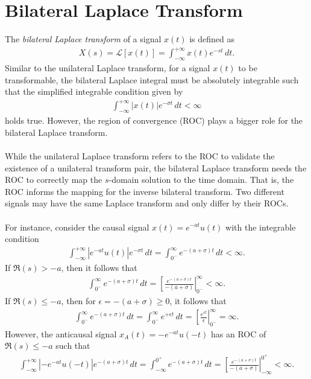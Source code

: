 \documentclass{report}
\begin{document}
\section{Bilateral Laplace Transform}
The \emph{bilateral Laplace transform} of a signal $x(t)$ is defined as  
\begin{align}
    X(s) = \mathcal{L}[x(t)] = \int_{-\infty}^{+\infty} x(t) e^{-st} \,dt.
\end{align}
Similar to the unilateral Laplace transform, for a signal $x(t)$ to be transformable, the bilateral Laplace integral must be absolutely integrable such that 
the simplified integrable condition given by 
\begin{align}
    \int_{-\infty}^{+\infty} |x(t)| e^{-\sigma t} \,dt < \infty
\end{align}
holds true. However, the region of convergence (ROC) plays a bigger role for the bilateral Laplace transform. 
\\ \\ 
While the unilateral Laplace transform refers to the ROC 
to validate the existence of a unilateral transform pair, the bilateral Laplace transform needs the ROC to correctly map the $s$-domain solution to the time domain. 
That is, the ROC informs the mapping for the inverse bilateral transform. Two different signals may have the same Laplace transform and only differ by their ROCs. 
\\ \\
For instance, consider the causal signal $x(t)=e^{-at}u(t)$ with the integrable condition
\begin{align*}
    \int_{-\infty}^{+\infty} |e^{-at}u(t)| e^{-\sigma t} \,dt = \int_{0^-}^{\infty} e^{-(a+\sigma) t} \,dt < \infty.
\end{align*}
If $\Re(s) > -a$, then it follows that 
\begin{align*}
    \int_{0^-}^{\infty} e^{-(a+\sigma) t} \,dt = \left[\frac{e^{-(a+\sigma) t}}{-(a+\sigma)}\right|_{0^-}^{\infty} < \infty.
\end{align*}
If $\Re(s) \leq -a$, then for $\epsilon=-(a+\sigma)\geq 0$, it follows that
\begin{align*}
    \int_{0^-}^{\infty} e^{-(a+\sigma) t} \,dt = \int_{0^-}^{\infty} e^{+\epsilon t} \,dt = \left[\frac{e^{\epsilon t}}{\epsilon}\right|_{0^-}^{\infty} = \infty.
\end{align*}
However, the anticausal signal $x_{A}(t)= -e^{-at}u(-t)$ has an ROC of $\Re(s)\leq -a$ such that 
\begin{align*}
    \int_{-\infty}^{+\infty} |-e^{-at}u(-t)|e^{-(a+\sigma) t} \,dt = \int_{-\infty}^{0^+} e^{-(a+\sigma)t} \,dt = \left[\frac{e^{-(a+\sigma) t}}{-(a+\sigma)}\right|_{-\infty}^{0^+} < \infty.
\end{align*}
\end{document}
